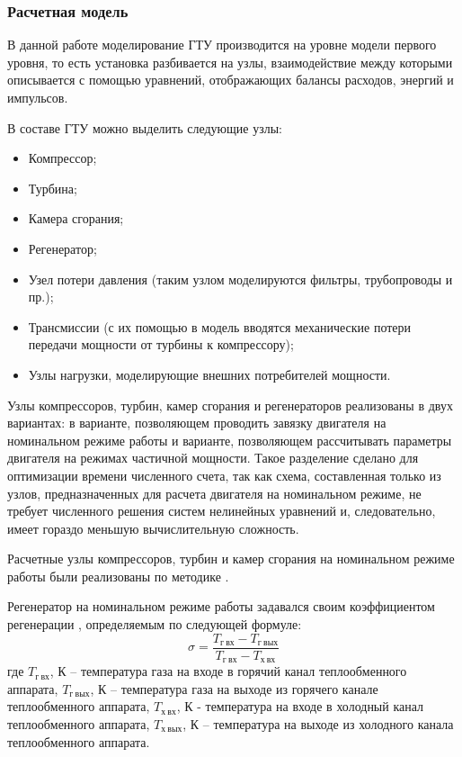 \subsubsection{Расчетная модель}

В данной работе моделирование ГТУ производится на уровне модели первого уровня, то есть установка разбивается на узлы, взаимодействие между которыми описывается с помощью уравнений, отображающих балансы расходов, энергий и импульсов.

В составе ГТУ можно выделить следующие узлы:
\begin{itemize}
	\item Компрессор;
	\item Турбина;
	\item Камера сгорания;
	\item Регенератор;
	\item Узел потери давления (таким узлом моделируются фильтры, трубопроводы и пр.);
	\item Трансмиссии (с их помощью в модель вводятся механические потери передачи мощности от турбины к компрессору);
	\item Узлы нагрузки, моделирующие внешних потребителей мощности.
\end{itemize}

Узлы компрессоров, турбин, камер сгорания и регенераторов реализованы в двух вариантах: в варианте, позволяющем проводить завязку двигателя на номинальном режиме работы и варианте, позволяющем рассчитывать параметры двигателя на режимах частичной мощности. Такое разделение сделано для оптимизации времени численного счета, так как схема, составленная только из узлов, предназначенных для расчета двигателя на номинальном режиме, не требует численного решения систем нелинейных уравнений и, следовательно, имеет гораздо меньшую вычислительную сложность. 

Расчетные узлы компрессоров, турбин и камер сгорания на номинальном режиме работы были реализованы по методике \cite{cycle_methodics}.

Регенератор на номинальном режиме работы задавался своим коэффициентом регенерации , определяемым по следующей формуле:
$$
	\sigma = \frac{
		T_{г \ вх} - T_{г \ вых}
	}{
		T_{г \ вх} - T_{х \ вх}
	}
$$
где $T_{г \ вх}$, К – температура газа на входе в горячий канал теплообменного аппарата, $T_{г \ вых}$, К – температура газа на выходе из горячего канале теплообменного аппарата, $T_{х \ вх}$, К - температура на входе в холодный канал теплообменного аппарата, $T_{х \ вых}$, К – температура на выходе из холодного канала теплообменного аппарата.

